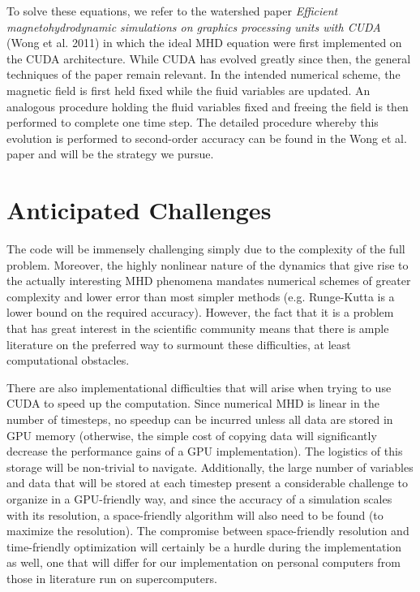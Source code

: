 \documentclass[10pt]{article}
\begin{document}
To solve these equations, we refer to the watershed paper \emph{Efficient magnetohydrodynamic simulations on graphics processing units with CUDA} (Wong et al. 2011) in which the ideal MHD equation were first implemented on the CUDA architecture. While CUDA has evolved greatly since then, the general techniques of the paper remain relevant. In the intended numerical scheme, the magnetic field is first held fixed while the fiuid variables are updated. An analogous procedure holding the fluid variables fixed and freeing the field is then performed to complete one time step. The detailed procedure whereby this evolution is performed to second-order accuracy can be found in the Wong et al. paper and will be the strategy we pursue.

\section{Anticipated Challenges}

The code will be immensely challenging simply due to the complexity of the full problem. Moreover, the highly nonlinear nature of the dynamics that give rise to the actually interesting MHD phenomena mandates numerical schemes of greater complexity and lower error than most simpler methods (e.g. Runge-Kutta is a lower bound on the required accuracy). However, the fact that it is a problem that has great interest in the scientific community means that there is ample literature on the preferred way to surmount these difficulties, at least computational obstacles.

There are also implementational difficulties that will arise when trying to use CUDA to speed up the computation. Since numerical MHD is linear in the number of timesteps, no speedup can be incurred unless all data are stored in GPU memory (otherwise, the simple cost of copying data will significantly decrease the performance gains of a GPU implementation). The logistics of this storage will be non-trivial to navigate. Additionally, the large number of variables and data that will be stored at each timestep present a considerable challenge to organize in a GPU-friendly way, and since the accuracy of a simulation scales with its resolution, a space-friendly algorithm will also need to be found (to maximize the resolution). The compromise between space-friendly resolution and time-friendly optimization will certainly be a hurdle during the implementation as well, one that will differ for our implementation on personal computers from those in literature run on supercomputers.
\end{document}
